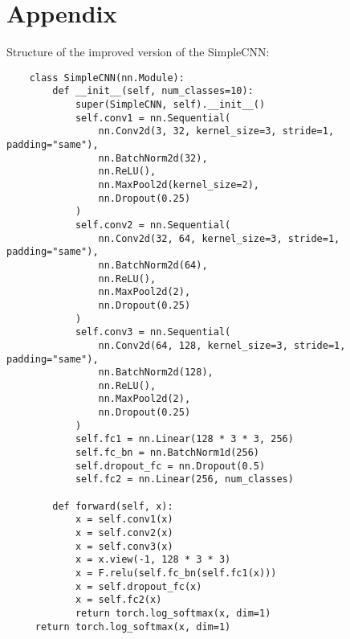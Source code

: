 \section{Appendix}


Structure of the improved version of the SimpleCNN:

\begin{verbatim}
    class SimpleCNN(nn.Module):
        def __init__(self, num_classes=10):
            super(SimpleCNN, self).__init__()
            self.conv1 = nn.Sequential(
                nn.Conv2d(3, 32, kernel_size=3, stride=1, padding="same"),
                nn.BatchNorm2d(32),
                nn.ReLU(),
                nn.MaxPool2d(kernel_size=2),
                nn.Dropout(0.25)
            )
            self.conv2 = nn.Sequential(
                nn.Conv2d(32, 64, kernel_size=3, stride=1, padding="same"),
                nn.BatchNorm2d(64),            
                nn.ReLU(),
                nn.MaxPool2d(2),
                nn.Dropout(0.25)
            )
            self.conv3 = nn.Sequential(
                nn.Conv2d(64, 128, kernel_size=3, stride=1, padding="same"),
                nn.BatchNorm2d(128),
                nn.ReLU(),
                nn.MaxPool2d(2),
                nn.Dropout(0.25)
            )
            self.fc1 = nn.Linear(128 * 3 * 3, 256)
            self.fc_bn = nn.BatchNorm1d(256)
            self.dropout_fc = nn.Dropout(0.5)
            self.fc2 = nn.Linear(256, num_classes)
        
        def forward(self, x):
            x = self.conv1(x)
            x = self.conv2(x)
            x = self.conv3(x)
            x = x.view(-1, 128 * 3 * 3)
            x = F.relu(self.fc_bn(self.fc1(x)))
            x = self.dropout_fc(x)
            x = self.fc2(x)
            return torch.log_softmax(x, dim=1)
     return torch.log_softmax(x, dim=1)
    \end{verbatim}
    